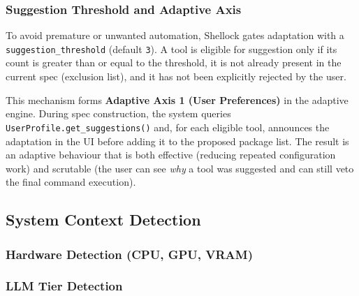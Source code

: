 \documentclass[12pt,a4paper]{article}
\begin{document}
\subsubsection{Suggestion Threshold and Adaptive Axis}

To avoid premature or unwanted automation, Shellock gates adaptation with a \texttt{suggestion\_threshold} (default
\texttt{3}). A tool is eligible for suggestion only if its count is greater than or equal to the threshold, it is not
already present in the current spec (exclusion list), and it has not been explicitly rejected by the user.

This mechanism forms \textbf{Adaptive Axis 1 (User Preferences)} in the adaptive engine. During spec construction, the
system queries \texttt{UserProfile.get\_suggestions()} and, for each eligible tool, announces the adaptation in the UI
before adding it to the proposed package list. The result is an adaptive behaviour that is both effective (reducing
repeated configuration work) and scrutable (the user can see \emph{why} a tool was suggested and can still veto the
final command execution).

\subsection{System Context Detection}

\subsubsection{Hardware Detection (CPU, GPU, VRAM)}

\subsubsection{LLM Tier Detection}



\end{document}
